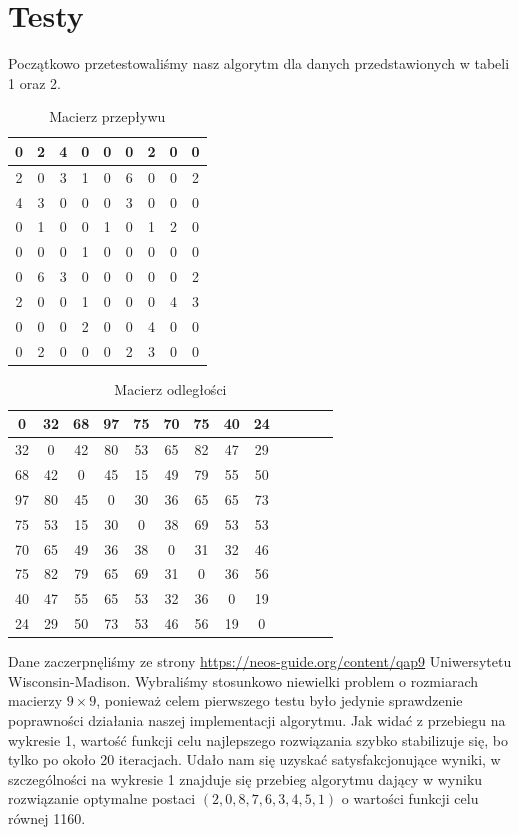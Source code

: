 \documentclass[12pt]{article}
\begin{document}
\section{Testy}
Początkowo przetestowaliśmy nasz algorytm dla danych przedstawionych w tabeli 1 oraz 2.
\begin{table}[H]
\caption{Macierz przepływu}
\begin{center}
	\begin{tabular}{| c | c | c | c | c | c | c | c | c |}
		\hline
0&2&4&0&0&0&2&0&0\\ \hline
2&0&3&1&0&6&0&0&2\\ \hline
4&3&0&0&0&3&0&0&0\\ \hline
0&1&0&0&1&0&1&2&0\\ \hline
0&0&0&1&0&0&0&0&0\\ \hline
0&6&3&0&0&0&0&0&2\\ \hline
2&0&0&1&0&0&0&4&3\\ \hline
0&0&0&2&0&0&4&0&0\\ \hline
0&2&0&0&0&2&3&0&0\\ \hline
	\end{tabular}
\end{center}
\end{table}
\begin{table}[H]
\caption{Macierz odległości}
\begin{center}
	\begin{tabular}{| c | c | c | c | c | c | c | c | c | c | c | c | c |}
		\hline
0&32&68&97&75&70&75&40&24\\ \hline
32&0&42&80&53&65&82&47&29\\ \hline
68&42&0&45&15&49&79&55&50\\ \hline
97&80&45&0&30&36&65&65&73\\ \hline
75&53&15&30&0&38&69&53&53\\ \hline
70&65&49&36&38&0&31&32&46\\ \hline
75&82&79&65&69&31&0&36&56\\ \hline
40&47&55&65&53&32&36&0&19\\ \hline
24&29&50&73&53&46&56&19&0\\ \hline
	\end{tabular}
\end{center}
\end{table}
Dane zaczerpnęliśmy ze strony \url{https://neos-guide.org/content/qap9} Uniwersytetu Wisconsin-Madison. Wybraliśmy stosunkowo niewielki problem o rozmiarach macierzy $9 \times 9$, ponieważ celem pierwszego testu było jedynie sprawdzenie poprawności działania naszej implementacji algorytmu. Jak widać z przebiegu na wykresie 1, wartość funkcji celu najlepszego rozwiązania szybko stabilizuje się, bo tylko po około 20 iteracjach. Udało nam się uzyskać satysfakcjonujące wyniki, w szczególności na wykresie 1 znajduje się przebieg algorytmu dający w wyniku rozwiązanie optymalne postaci $(2, 0, 8, 7, 6, 3, 4, 5, 1)$ o wartości funkcji celu równej 1160.
\end{document}
